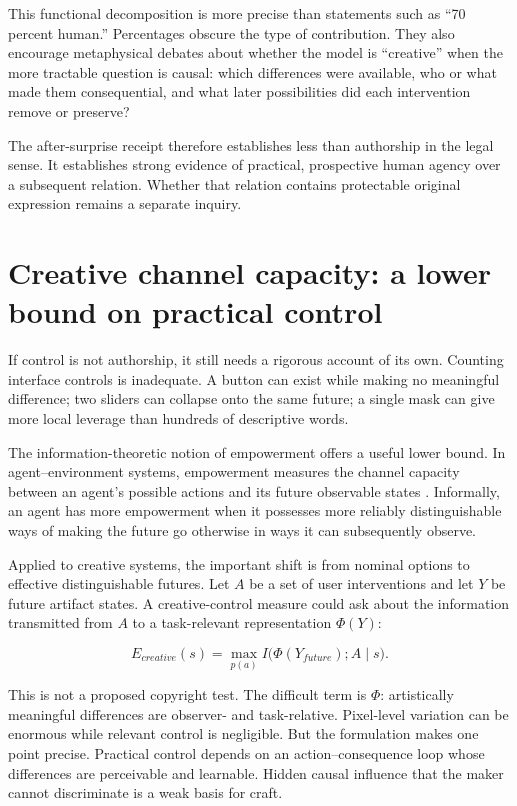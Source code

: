 \documentclass[11pt]{article}
\begin{document}
This functional decomposition is more precise than statements such as ``70 percent human.'' Percentages obscure the type of contribution. They also encourage metaphysical debates about whether the model is ``creative'' when the more tractable question is causal: which differences were available, who or what made them consequential, and what later possibilities did each intervention remove or preserve?

The after-surprise receipt therefore establishes less than authorship in the legal sense. It establishes strong evidence of practical, prospective human agency over a subsequent relation. Whether that relation contains protectable original expression remains a separate inquiry.

\section{Creative channel capacity: a lower bound on practical control}

If control is not authorship, it still needs a rigorous account of its own. Counting interface controls is inadequate. A button can exist while making no meaningful difference; two sliders can collapse onto the same future; a single mask can give more local leverage than hundreds of descriptive words.

The information-theoretic notion of empowerment offers a useful lower bound. In agent--environment systems, empowerment measures the channel capacity between an agent's possible actions and its future observable states \citep{JungPolaniStone2011}. Informally, an agent has more empowerment when it possesses more reliably distinguishable ways of making the future go otherwise in ways it can subsequently observe.

Applied to creative systems, the important shift is from nominal options to effective distinguishable futures. Let $A$ be a set of user interventions and let $Y$ be future artifact states. A creative-control measure could ask about the information transmitted from $A$ to a task-relevant representation $\Phi(Y)$:

\[
E_{creative}(s) = \max_{p(a)} I\big(\Phi(Y_{future}); A \mid s\big).
\]

This is not a proposed copyright test. The difficult term is $\Phi$: artistically meaningful differences are observer- and task-relative. Pixel-level variation can be enormous while relevant control is negligible. But the formulation makes one point precise. Practical control depends on an action--consequence loop whose differences are perceivable and learnable. Hidden causal influence that the maker cannot discriminate is a weak basis for craft.
\end{document}
